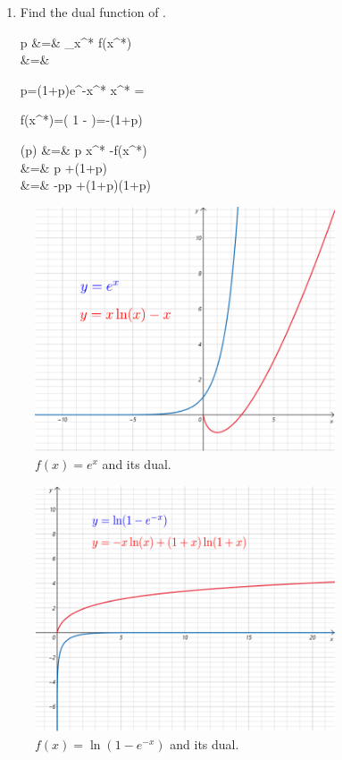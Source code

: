 \begin{enumerate}
\hrule

\item
Find the dual function of
\beq
{}
\;.
\eeq

\beqa
p
&=&
\partial_{x^*} f(x^*)
\\
&=&
\eeqa

\beq
p=(1+p)e^{-x^*}
\eeq
\beq
x^* = \ln{}
\eeq

\beq
f(x^*)=\ln\left(
1 - 
\right)=-\ln(1+p)
\eeq

\beqa
{}(p) &=& p x^* -f(x^*)
\\
&=&
p \ln{}
+\ln(1+p)
\\
&=&
-p\ln  p
+(1+p)\ln(1+p)
\eeqa
\end{enumerate}


\begin{figure}[h!]
\centering
\includegraphics[width=3.5in]
{conventions/dual-ex.png}
\caption{$f(x)=e^x$ and its dual.}
\label{fig-dual-ex}
\end{figure}

\begin{figure}[h!]
\centering
\includegraphics[width=3.5in]
{conventions/dual-ln-1-e-x.png}
\caption{$f(x)=\ln(1-e^{-x})$ and its dual.}
\label{fig-dual-dual-ln-1-e-x}
\end{figure}




